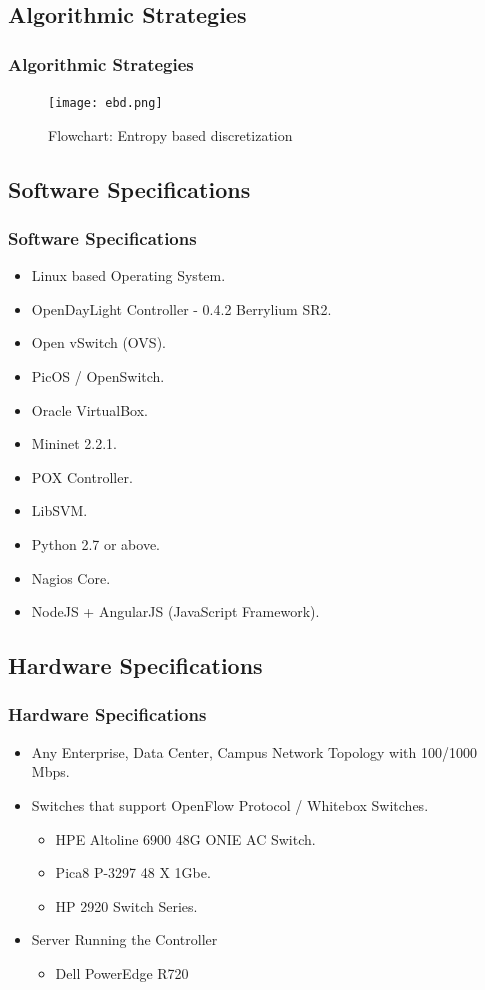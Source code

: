 \documentclass[10pt]{beamer}
\begin{document}
\begin{frame}
\section[]{Algorithmic Strategies}
\frametitle{Algorithmic Strategies}
\begin{figure}
\texttt{[image: ebd.png]}
\caption{\footnotesize Flowchart: Entropy based discretization}
\end{figure}
\end{frame}

	

\begin{frame}
\section[]{Software Specifications}
\frametitle{Software Specifications}
\begin{itemize}
\footnotesize
\item
Linux based Operating System.
\item
OpenDayLight Controller - 0.4.2 Berrylium SR2.
\item
Open vSwitch (OVS).
\item
PicOS / OpenSwitch.
\item
Oracle VirtualBox.
\item
Mininet 2.2.1.
\item
POX Controller.
\item
LibSVM.
\item
Python 2.7 or above.
\item
Nagios Core.
\item
NodeJS + AngularJS (JavaScript Framework). 
\end{itemize}
\end{frame}

\begin{frame}
\section[]{Hardware Specifications}
\frametitle{Hardware Specifications}
\begin{itemize}
\footnotesize
\item
Any Enterprise, Data Center, Campus Network Topology with 100/1000 Mbps.
\item
Switches that support OpenFlow Protocol / Whitebox Switches.
\begin{itemize}
\footnotesize
\item
HPE Altoline 6900 48G ONIE AC Switch.
\item
Pica8 P-3297 48 X 1Gbe.
\item
HP 2920 Switch Series.
\end{itemize}

\item
Server Running the Controller
\begin{itemize}
\footnotesize
\item
Dell PowerEdge R720
\end{itemize}

\end{itemize}
\end{frame}
\end{document}
